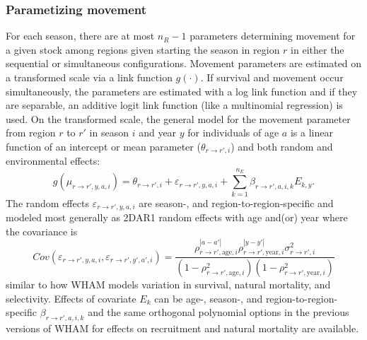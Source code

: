 \documentclass[
]{article}
\begin{document}
\hypertarget{parametizing-movement}{%
\subsubsection*{Parametizing movement}\label{parametizing-movement}}

For each season, there are at most \(n_R-1\) parameters determining movement for a given stock among regions given starting the season in region \(r\) in either the sequential or simultaneous configurations. Movement parameters are estimated on a transformed scale via a link function \(g(\cdot)\). If survival and movement occur simultaneously, the parameters are estimated with a log link function and if they are separable, an additive logit link function (like a multinomial regression) is used. On the transformed scale, the general model for the movement parameter from region \(r\) to \(r'\) in season \(i\) and year \(y\) for individuals of age \(a\) is a linear function of an intercept or mean parameter (\(\theta_{r\rightarrow r',i}\)) and both random and environmental effects:
\begin{equation*}
  g(\mu_{r\rightarrow r',y,a,i}) = \theta_{r\rightarrow r',i} + \varepsilon_{r\rightarrow r',y,a,i} + \sum^{n_E}_{k=1} \beta_{r \rightarrow r',a,i,k} E_{k,y}.
\end{equation*}
The random effects \(\varepsilon_{r\rightarrow r',y,a,i}\) are season-, and region-to-region-specific and modeled most generally as 2DAR1 random effects with age and(or) year where the covariance is
\begin{equation*}
  Cov\left(\varepsilon_{r\rightarrow r',y,a,i},\varepsilon_{r\rightarrow r',y',a',i}\right) =   \frac{\rho_{r\rightarrow r',\text{age},i}^{|a-a'|}\rho_{r\rightarrow r',\text{year},i}^{|y-y'|}\sigma^2_{r\rightarrow r',i}}{\left(1 -  \rho_{r\rightarrow r',\text{age},i}^2\right)\left(1 - \rho_{r\rightarrow r',\text{year},i}^2\right)}
\end{equation*}
similar to how WHAM models variation in survival, natural mortality, and selectivity. Effects of covariate \(E_k\) can be age-, season-, and region-to-region-specific \(\beta_{r\rightarrow r',a,i,k}\) and the same orthogonal polynomial options in the previous versions of WHAM for effects on recruitment and natural mortality are available.
\end{document}
